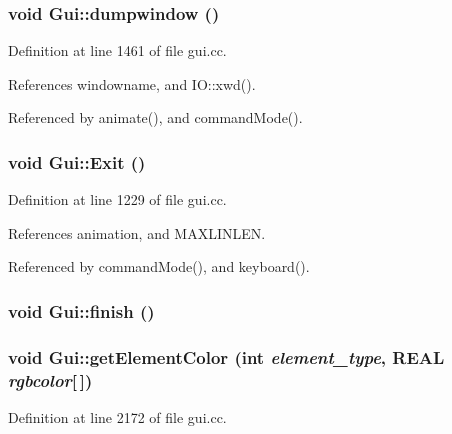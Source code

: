 \hypertarget{namespaceGui_6ad1b72a8dc01fe97af9fe591a365a5e}{
\subsubsection[{dumpwindow}]{\setlength{\rightskip}{0pt plus 5cm}void Gui::dumpwindow ()}}
\label{namespaceGui_6ad1b72a8dc01fe97af9fe591a365a5e}




Definition at line 1461 of file gui.cc.

References windowname, and IO::xwd().

Referenced by animate(), and commandMode().\hypertarget{namespaceGui_992c5b9e252d42f351c0b4559f3dc594}{
\subsubsection[{Exit}]{\setlength{\rightskip}{0pt plus 5cm}void Gui::Exit ()}}
\label{namespaceGui_992c5b9e252d42f351c0b4559f3dc594}




Definition at line 1229 of file gui.cc.

References animation, and MAXLINLEN.

Referenced by commandMode(), and keyboard().\hypertarget{namespaceGui_0a78be634dd9a0fd330799e5d6a2bada}{
\subsubsection[{finish}]{\setlength{\rightskip}{0pt plus 5cm}void Gui::finish ()}}
\label{namespaceGui_0a78be634dd9a0fd330799e5d6a2bada}


\hypertarget{namespaceGui_b4972a7318cbe5e96312527816694e1e}{
\subsubsection[{getElementColor}]{\setlength{\rightskip}{0pt plus 5cm}void Gui::getElementColor (int {\em element\_\-type}, \/  REAL {\em rgbcolor}\mbox{[}$\,$\mbox{]})}}
\label{namespaceGui_b4972a7318cbe5e96312527816694e1e}




Definition at line 2172 of file gui.cc.

